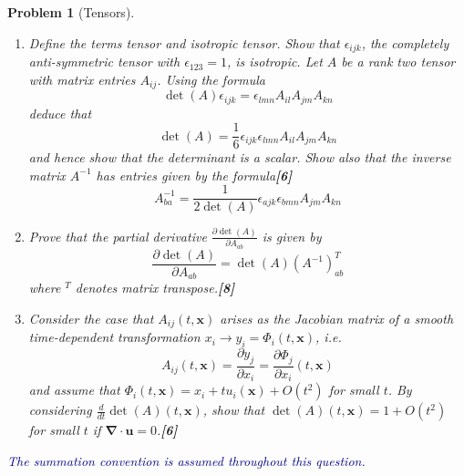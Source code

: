 \documentclass[a4paper]{article}
\theoremstyle{new}
\newtheorem{qns}{Problem}[section]
\begin{document}
\begin{qns}[Tensors]\leavevmode
\begin{enumerate}[label=(\roman*)]
    \item Define the terms tensor and isotropic tensor. Show that $\epsilon_{ijk}$, the completely anti-symmetric tensor with $\epsilon_{123}=1$, is isotropic. Let $A$ be a rank two tensor with matrix entries $A_{ij}$. Using the formula
$$\det(A)\epsilon_{ijk}=\epsilon_{lmn}A_{il}A_{jm}A_{kn}$$
deduce that
$$\det(A)=\frac{1}{6}\epsilon_{ijk}\epsilon_{lmn}A_{il}A_{jm}A_{kn}$$
and hence show that the determinant is a scalar. Show also that the inverse matrix $A^{-1}$ has entries given by the formula\hfill\textbf{[6]}
$$A^{-1}_{ba}=\frac{1}{2\det(A)}\epsilon_{ajk}\epsilon_{bmn}A_{jm}A_{kn}$$
\item Prove that the partial derivative $\frac{\partial\det(A)}{\partial A_{ab}}$ is given by
$$\frac{\partial\det(A)}{\partial A_{ab}}=\det(A)(A^{-1})^T_{ab}$$
where $^T$ denotes matrix transpose.\hfill\textbf{[8]}
\item Consider the case that $A_{ij}(t, \mathbf{x})$ arises as the Jacobian matrix of a smooth time-dependent transformation $x_i\rightarrow y_i=\Phi_i(t,\mathbf{x})$, i.e.
$$A_{ij}(t,\mathbf{x})=\frac{\partial y_j}{\partial x_i}=\frac{\partial\Phi_j}{\partial x_i}(t,\mathbf{x})$$
and assume that $\Phi_i(t, \mathbf{x}) = x_i + tu_i(\mathbf{x}) + O(t^2)$ for small $t$. By considering $\frac{d}{dt}\det(A)(t,\mathbf{x})$, show that $\det(A)(t,\mathbf{x})=1+O(t^2)$ for small $t$ if $\boldsymbol{\nabla}\cdot\mathbf{u}=0$.\hfill\textbf{[6]}
\end{enumerate}
\begin{mdframed}
\textcolor{darkblue}{The summation convention is assumed throughout this question.}
\end{mdframed}
\end{qns}
\end{document}
